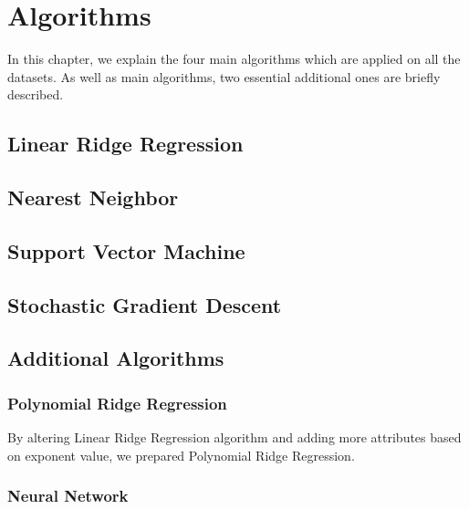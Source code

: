 \section{Algorithms}
In this chapter, we explain the four main algorithms which are applied on all the datasets. As well as main algorithms, two essential additional ones are briefly described.

\subsection{Linear Ridge Regression}
\subsection{Nearest Neighbor}
\subsection{Support Vector Machine}
\subsection{Stochastic Gradient Descent}
\subsection{Additional Algorithms}
\subsubsection{Polynomial Ridge Regression}
By altering Linear Ridge Regression algorithm and adding more attributes based on exponent value, we prepared Polynomial Ridge Regression.
\subsubsection{Neural Network}
